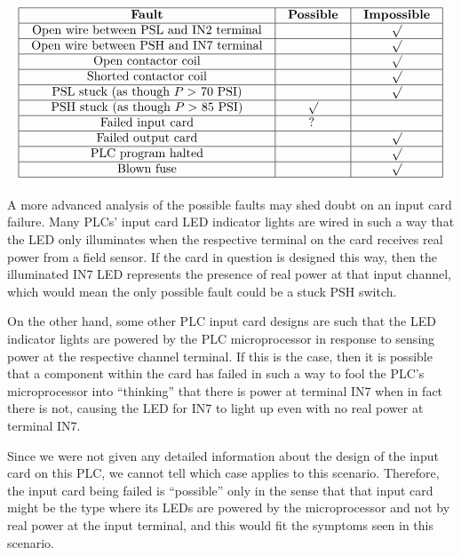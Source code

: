 $$\vbox{\offinterlineskip
\halign{\strut
\vrule \quad\hfil # \ \hfil & 
\vrule \quad\hfil # \ \hfil & 
\vrule \quad\hfil # \ \hfil \vrule \cr
\noalign{\hrule}
%
{\bf Fault} & {\bf Possible} & {\bf Impossible} \cr
%
\noalign{\hrule}
%
Open wire between PSL and IN2 terminal &  & $\surd$ \cr
%
\noalign{\hrule}
%
Open wire between PSH and IN7 terminal &  & $\surd$ \cr
%
\noalign{\hrule}
%
Open contactor coil &  & $\surd$ \cr
%
\noalign{\hrule}
%
Shorted contactor coil &  & $\surd$ \cr
%
\noalign{\hrule}
%
PSL stuck (as though $P >$ 70 PSI) &  & $\surd$ \cr
%
\noalign{\hrule}
%
PSH stuck (as though $P >$ 85 PSI) & $\surd$ &  \cr
%
\noalign{\hrule}
%
Failed input card & ? &  \cr
%
\noalign{\hrule}
%
Failed output card &  & $\surd$ \cr
%
\noalign{\hrule}
%
PLC program halted &  & $\surd$ \cr
%
\noalign{\hrule}
%
Blown fuse &  & $\surd$ \cr
%
\noalign{\hrule}
} %
}$$ %

A more advanced analysis of the possible faults may shed doubt on an input card failure.  Many PLCs' input card LED indicator lights are wired in such a way that the LED only illuminates when the respective terminal on the card receives real power from a field sensor.  If the card in question is designed this way, then the illuminated IN7 LED represents the presence of real power at that input channel, which would mean the only possible fault could be a stuck PSH switch.  

On the other hand, some other PLC input card designs are such that the LED indicator lights are powered by the PLC microprocessor in response to sensing power at the respective channel terminal.  If this is the case, then it is possible that a component within the card has failed in such a way to fool the PLC's microprocessor into ``thinking'' that there is power at terminal IN7 when in fact there is not, causing the LED for IN7 to light up even with no real power at terminal IN7.

Since we were not given any detailed information about the design of the input card on this PLC, we cannot tell which case applies to this scenario.  Therefore, the input card being failed is ``possible'' only in the sense that that input card might be the type where its LEDs are powered by the microprocessor and not by real power at the input terminal, and this would fit the symptoms seen in this scenario.



